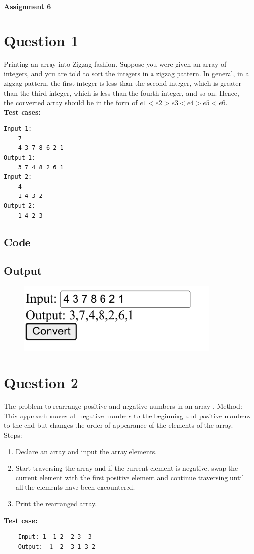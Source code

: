 \documentclass{article}
\begin{document}
{\centerline{\bfseries \Huge Assignment 6}}

\section*{Question 1}
Printing an array into Zigzag fashion. Suppose you were given an array of integers,
and you are told to sort the integers in a zigzag pattern. In general, in a zigzag pattern,
the first integer is less than the second integer, which is greater than the third integer,
which is less than the fourth integer, and so on. Hence, the converted array should be
in the form of $e1 < e2 > e3 < e4 > e5 < e6$. \\
\textbf{Test cases:}
\begin{lstlisting}
Input 1:
    7
    4 3 7 8 6 2 1
Output 1:
    3 7 4 8 2 6 1
Input 2:
    4
    1 4 3 2
Output 2:
    1 4 2 3
\end{lstlisting}
\subsection*{Code}

\newpage
\subsection*{Output}
\begin{figure}[H]
    \centering
    \includegraphics[width=10cm]{1/out.png}
\end{figure}

\newpage
\section*{Question 2}
The problem to rearrange positive and negative numbers in an array .
Method: This approach moves all negative numbers to the beginning and positive
numbers to the end but changes the order of appearance of the elements of the array.
Steps:
\begin{enumerate}
    \item Declare an array and input the array elements.
    \item Start traversing the array and if the current element is negative, swap the
          current element with the first positive element and continue traversing until all
          the elements have been encountered.
    \item Print the rearranged array.
\end{enumerate}
\textbf{Test case:}
\begin{lstlisting}
    Input: 1 -1 2 -2 3 -3
    Output: -1 -2 -3 1 3 2
\end{lstlisting}
\end{document}
